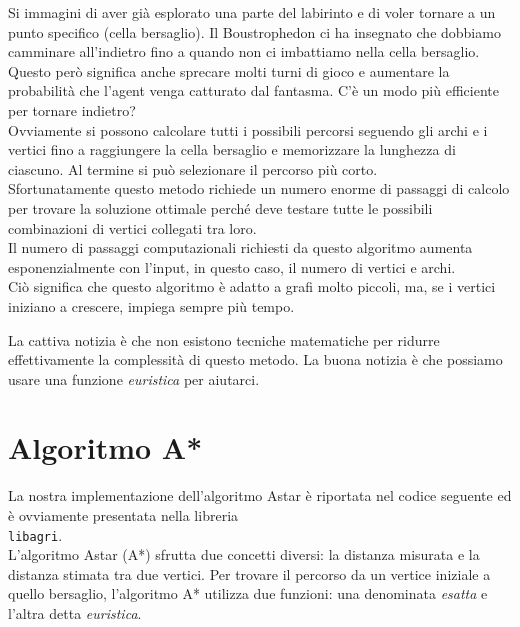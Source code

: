 \documentclass[8pt]{book}
\begin{document}
Si immagini di aver già esplorato una parte del labirinto e di voler tornare a un punto specifico (cella bersaglio). Il Boustrophedon ci ha insegnato che dobbiamo camminare all'indietro fino a quando non ci imbattiamo nella cella bersaglio. Questo però significa anche sprecare molti turni di gioco e aumentare la probabilità che l'agent venga catturato dal fantasma. C'è un modo più efficiente per tornare indietro?\\
Ovviamente si possono calcolare tutti i possibili percorsi seguendo gli archi e i vertici fino a raggiungere la cella bersaglio e memorizzare la lunghezza di ciascuno. Al termine si può selezionare il percorso più corto.\\
Sfortunatamente questo metodo richiede un numero enorme di passaggi di calcolo per trovare la soluzione ottimale perché deve testare tutte le possibili combinazioni di vertici collegati tra loro.\\
Il numero di passaggi computazionali richiesti da questo algoritmo aumenta esponenzialmente con l'input, in questo caso, il numero di vertici e archi.\\
Ciò significa che questo algoritmo è adatto a grafi molto piccoli, ma, se i vertici iniziano a crescere, impiega sempre più tempo.

La cattiva notizia è che non esistono tecniche matematiche per ridurre effettivamente la complessità di questo metodo. La buona notizia è che possiamo usare una funzione \emph{euristica} per aiutarci.

\section{Algoritmo A*}

La nostra implementazione dell'algoritmo Astar è riportata nel codice seguente ed è ovviamente presentata nella libreria \\\texttt{libagri}.\\
L'algoritmo Astar (A*) sfrutta due concetti diversi: la distanza misurata e la distanza stimata tra due vertici. Per trovare il percorso da un vertice iniziale a quello bersaglio, l'algoritmo A* utilizza due funzioni: una denominata \emph{esatta} e l'altra detta \emph{euristica}.
\end{document}

